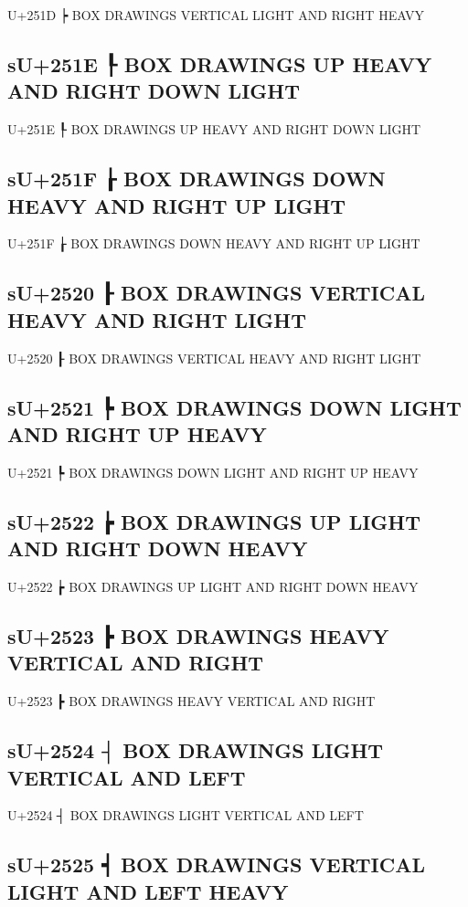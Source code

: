U+251D ┝ BOX DRAWINGS VERTICAL LIGHT AND RIGHT HEAVY

\subsection{sU+251E ┞ BOX DRAWINGS UP HEAVY AND RIGHT DOWN LIGHT}

U+251E ┞ BOX DRAWINGS UP HEAVY AND RIGHT DOWN LIGHT

\subsection{sU+251F ┟ BOX DRAWINGS DOWN HEAVY AND RIGHT UP LIGHT}

U+251F ┟ BOX DRAWINGS DOWN HEAVY AND RIGHT UP LIGHT

\subsection{sU+2520 ┠ BOX DRAWINGS VERTICAL HEAVY AND RIGHT LIGHT}

U+2520 ┠ BOX DRAWINGS VERTICAL HEAVY AND RIGHT LIGHT

\subsection{sU+2521 ┡ BOX DRAWINGS DOWN LIGHT AND RIGHT UP HEAVY}

U+2521 ┡ BOX DRAWINGS DOWN LIGHT AND RIGHT UP HEAVY

\subsection{sU+2522 ┢ BOX DRAWINGS UP LIGHT AND RIGHT DOWN HEAVY}

U+2522 ┢ BOX DRAWINGS UP LIGHT AND RIGHT DOWN HEAVY

\subsection{sU+2523 ┣ BOX DRAWINGS HEAVY VERTICAL AND RIGHT}

U+2523 ┣ BOX DRAWINGS HEAVY VERTICAL AND RIGHT

\subsection{sU+2524 ┤ BOX DRAWINGS LIGHT VERTICAL AND LEFT}

U+2524 ┤ BOX DRAWINGS LIGHT VERTICAL AND LEFT

\subsection{sU+2525 ┥ BOX DRAWINGS VERTICAL LIGHT AND LEFT HEAVY}

